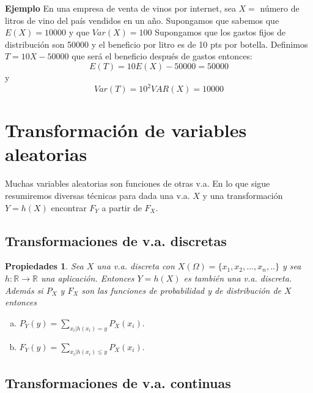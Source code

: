 \documentclass[handout]{beamer}\usepackage[]{graphicx}\usepackage[]{color}
\newcommand{\RR}{\mathbb{R}}
\renewcommand{\leq}{\leqslant}
\theoremstyle{plain}
\newtheorem{prop}{Propiedades}
\theoremstyle{definition}
\begin{document}
\begin{frame}

\textbf{Ejemplo}
En una empresa de venta de vinos por internet, sea
$X=$ número de  litros de vino del país vendidos en un año.
Supongamos que sabemos que $E(X)=10000$ y que $Var(X)=100$
Supongamos que los gastos fijos de distribución son
50000 y el beneficio por litro es de 10 pts por botella.
Definimos $T=10 X-50000$ que será el beneficio después de gastos
entonces:
$$E(T)=10 E(X)-50000 = 50000$$
y
$$Var(T)=10^2 VAR(X)= 10000$$

\end{frame}
\section{Transformación de variables aleatorias}
\begin{frame}


Muchas variables aleatorias son funciones de otras v.a. En lo que
sigue resumiremos diversas técnicas para dada una v.a. $X$ y una
transformación $Y=h(X)$  encontrar $F_{Y}$ a
partir de $F_{X}$.

\end{frame}
\subsection{Transformaciones de v.a. discretas}


\begin{frame}


\begin{prop}
Sea $X$ una v.a. discreta con \newline
$X(\Omega)=\{x_{1},x_{2},\ldots,x_{n},..\}$ y sea $h:\RR\to\RR$ una aplicación.
Entonces $Y=h(X)$ es también una v.a. discreta. Además si $P_X$
y $F_{X}$ son las funciones de probabilidad y de distribución de
$X$ entonces

\begin{enumerate}[a)]
\item $\displaystyle P_{Y}(y)=\sum_{x_{i}|h(x_{i})=y}P_X(x_{i}).$
\item $\displaystyle F_{Y}(y)=\sum_{x_{i}|h(x_{i})\leq y} P_X(x_{i}).$
\end{enumerate}
\end{prop}
\end{frame}
\subsection{Transformaciones de v.a. continuas}
\end{document}
